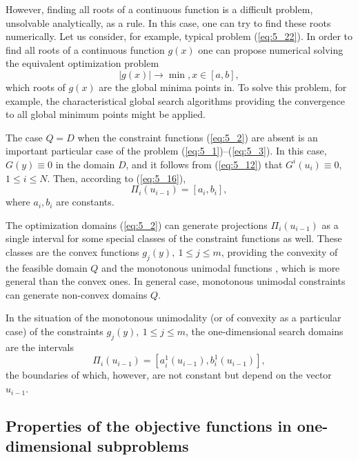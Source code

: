 However, finding all roots of a continuous function is a difficult problem, unsolvable analytically, as a rule. In this case, one can try to find these roots numerically. Let us consider, for example, typical problem (\ref{eq:5_22}). In order to find all roots of a continuous function $g(x)$ one can propose  numerical solving  the equivalent optimization problem 
\begin{displaymath}
\left|g(x)\right|\rightarrow \min,x\in [a,b],
\end{displaymath}
which roots of $g(x)$ are the global minima points in. To solve this problem, for example, the characteristical global search algorithms \cite{5_GrishaginSergeyevStrongin} providing the convergence to all global minimum points might be applied.

The case $Q=D$  when the constraint functions (\ref{eq:5_2}) are absent is an important particular case of the problem (\ref{eq:5_1})--(\ref{eq:5_3}). In this case, $G(y)\equiv 0$ in the domain $D$, and it follows from (\ref{eq:5_12}) that $G^i(u_i)\equiv 0$,$1\leq i\leq N$. Then, according to (\ref{eq:5_16}), 
\begin{displaymath}
\Pi_i(u_{i-1})=[a_i,b_i],
\end{displaymath}
where $a_i,b_i$ are constants.

The optimization domains (\ref{eq:5_2}) can generate projections $\Pi_i(u_{i-1})$  as a single interval for some special classes of the constraint functions as well. These classes are the convex functions $g_j(y),\:1\leq j\leq m$, providing the convexity of the feasible domain $Q$ and the monotonous unimodal functions \cite{5_GrishaginStrongin_EnginCybernetics}, which is more general than the convex ones.  In general case, monotonous unimodal constraints can generate non-convex domains $Q$.

In the situation of the monotonous unimodality (or of convexity as a particular case) of the constraints $g_j(y),\:1\leq j\leq m$, the one-dimensional search domains are the intervals 
\begin{displaymath}
\Pi_i(u_{i-1})=[a_i^1(u_{i-1}),b_i^1(u_{i-1})],
\end{displaymath}
the boundaries of which, however, are not constant but depend on the vector $u_{i-1}$.
\subsection {Properties of the objective functions in one-dimensional subproblems}
\label{subsec:5_2_2}

